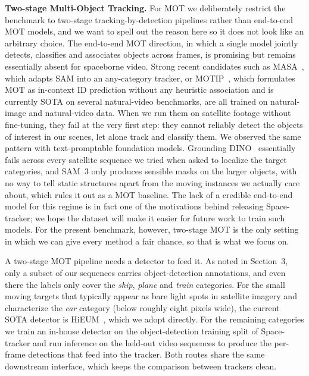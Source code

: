 \documentclass{article}
\begin{document}
\noindent\textbf{Two-stage Multi-Object Tracking.}
For MOT we deliberately restrict the benchmark to two-stage
tracking-by-detection pipelines rather than end-to-end MOT models, and we
want to spell out the reason here so it does not look like an arbitrary
choice. The end-to-end MOT direction, in which a single model jointly
detects, classifies and associates objects across frames, is promising
but remains essentially absent for spaceborne video. Strong recent
candidates such as MASA~\citep{li2024masa}, which adapts SAM into an
any-category tracker, or MOTIP~\citep{gao2024motip}, which formulates MOT
as in-context ID prediction without any heuristic association and is
currently SOTA on several natural-video benchmarks, are all trained on
natural-image and natural-video data. When we run them on satellite
footage without fine-tuning, they fail at the very first step: they
cannot reliably detect the objects of interest in our scenes, let alone
track and classify them. We observed the same pattern with
text-promptable foundation models. Grounding
DINO~\citep{liu2024groundingdino} essentially fails across every
satellite sequence we tried when asked to localize the target categories,
and SAM~3 only produces sensible masks
on the larger objects, with no way to tell static structures apart from
the moving instances we actually care about, which rules it out as a MOT
baseline. The lack of a credible end-to-end model for this regime is in
fact one of the motivations behind releasing Space-tracker; we hope the
dataset will make it easier for future work to train such models. For
the present benchmark, however, two-stage MOT is the only setting in
which we can give every method a fair chance, so that is what we focus
on.

A two-stage MOT pipeline needs a detector to feed it. As noted in
Section~3, only a subset of our sequences carries object-detection
annotations, and even there the labels only cover the \textit{ship},
\textit{plane} and \textit{train} categories. For the small moving
targets that typically appear as bare light spots in satellite imagery
and characterize the \textit{car} category (below roughly eight pixels
wide), the current SOTA detector is HiEUM~\citep{Xiao2024HiEUM}, which we
adopt directly. For
the remaining categories we train an in-house detector on the
object-detection training split of Space-tracker and run inference on
the held-out video sequences to produce the per-frame detections that
feed into the tracker. Both routes share the same downstream interface,
which keeps the comparison between trackers clean.
\end{document}
